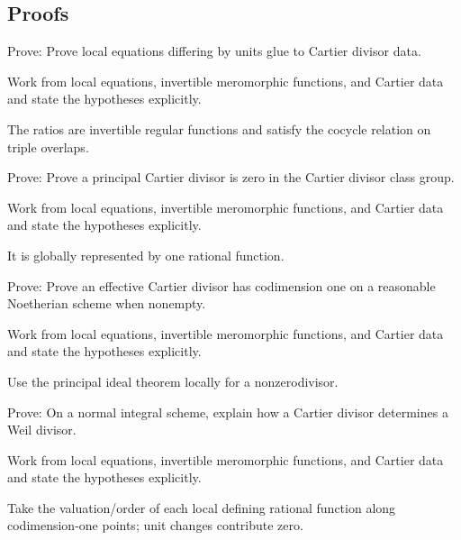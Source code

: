 \subsection*{Proofs}

\begin{exercise}\label{exr:vi40-expand-06}
Prove: Prove local equations differing by units glue to Cartier divisor data.
\end{exercise}
\begin{hint}
Work from local equations, invertible meromorphic functions, and Cartier data and state the hypotheses explicitly.
\end{hint}
\begin{solution}
The ratios are invertible regular functions and satisfy the cocycle relation on triple overlaps.
\end{solution}

\begin{exercise}\label{exr:vi40-expand-07}
Prove: Prove a principal Cartier divisor is zero in the Cartier divisor class group.
\end{exercise}
\begin{hint}
Work from local equations, invertible meromorphic functions, and Cartier data and state the hypotheses explicitly.
\end{hint}
\begin{solution}
It is globally represented by one rational function.
\end{solution}

\begin{exercise}\label{exr:vi40-expand-08}
Prove: Prove an effective Cartier divisor has codimension one on a reasonable Noetherian scheme when nonempty.
\end{exercise}
\begin{hint}
Work from local equations, invertible meromorphic functions, and Cartier data and state the hypotheses explicitly.
\end{hint}
\begin{solution}
Use the principal ideal theorem locally for a nonzerodivisor.
\end{solution}

\begin{exercise}\label{exr:vi40-expand-09}
Prove: On a normal integral scheme, explain how a Cartier divisor determines a Weil divisor.
\end{exercise}
\begin{hint}
Work from local equations, invertible meromorphic functions, and Cartier data and state the hypotheses explicitly.
\end{hint}
\begin{solution}
Take the valuation/order of each local defining rational function along codimension-one points; unit changes contribute zero.
\end{solution}

